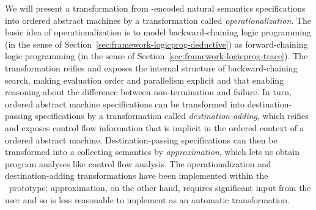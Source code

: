 We will present a transformation from \sls-encoded natural semantics
specifications into ordered abstract machines by a transformation
called {\it operationalization}. The basic idea of operationalization
is to model backward-chaining logic programming (in the sense of
Section~\ref{sec:framework-logicprog-deductive}) as forward-chaining
logic programming (in the sense of
Section~\ref{sec:framework-logicprog-trace}). The transformation
reifies and exposes the internal structure of backward-chaining
search, making evaluation order and parallelism explicit and that
enabling reasoning about the difference between non-termination and
failure. In turn, ordered abstract machine specifications can be
transformed into destination-passing specifications by a
transformation called {\it destination-adding}, which reifies and
exposes control flow information that is implicit in the ordered
context of a ordered abstract machine.  Destination-passing
specifications can then be transformed into a collecting semantics by
{\it approximation}, which lets us obtain program analyses like
control flow analysis. The operationalization and destination-adding
transformations have been implemented within the
\sls~prototype; approximation, on the other hand,
requires significant input from the user and so is less reasonable
to implement as an automatic transformation. 


